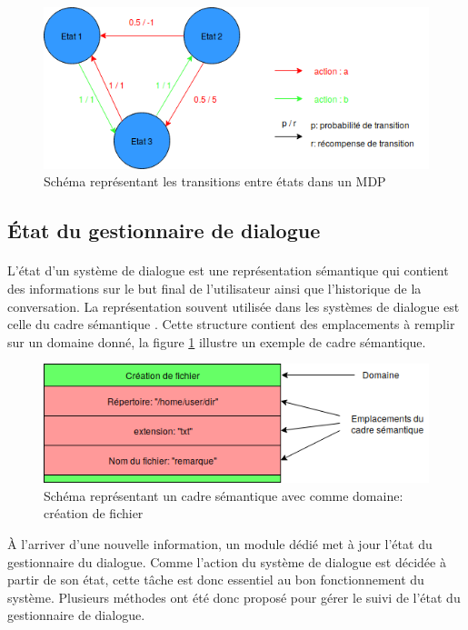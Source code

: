 	\begin{figure}[H]
		\centering
		\includegraphics[width=.95\linewidth]{images/DM/MDP.png} 
		\caption{Schéma représentant les transitions entre états dans un MDP} 
	\end{figure}
	
	
	\subsection{État du gestionnaire de dialogue}
		\paragraph{}
		L’état d’un système de dialogue est une représentation sémantique qui contient des informations sur le but final de l’utilisateur ainsi que l’historique de la conversation. La représentation souvent utilisée dans les systèmes de dialogue est celle du cadre sémantique \cite{Chen2017}. Cette structure contient des emplacements à remplir sur un domaine donné, la figure \ref{SFrame} illustre un exemple de cadre sémantique.\newline
		
		\begin{figure}[H]
			\centering
			\includegraphics[width=.7\linewidth]{images/DM/SFrame.png} 
			\caption{Schéma représentant un cadre sémantique avec comme domaine: création de fichier} 
			\label{SFrame}
		\end{figure}


À l’arriver d’une nouvelle information, un module dédié met à jour l’état du gestionnaire du dialogue. Comme l’action du système de dialogue est décidée à partir de son état, cette tâche est donc essentiel au bon fonctionnement du système. Plusieurs méthodes ont été donc proposé pour gérer le suivi de l’état du gestionnaire de dialogue.
